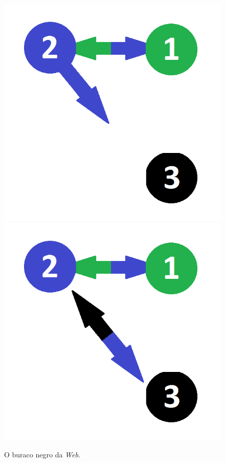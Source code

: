 \
\begin{figure}[!htb]
	\centering
	\includegraphics[scale=0.35]{imagens/blackhole1}
	\hspace{0.1cm}
	\includegraphics[scale=0.35]{imagens/blackhole2}
	\caption{O buraco negro da \textit{Web}.}
	\label{blackhole}
\end{figure}

